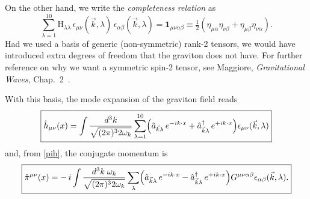 \documentclass[12pt,a4paper,oneside]{article}
\numberwithin{equation}{section}   %
\begin{document}
On the other hand, we write the
\textit{completeness relation} as
\begin{equation}
  \sum_{\lambda=1}^{10}\mathrm{H}_{\lambda\lambda}\,
  \epsilon_{\mu\nu}(\vec{k},\lambda)\,\epsilon_{\alpha\beta}(\vec{k},\lambda)
  = \mathbf{1}_{\mu\nu\alpha\beta}
  \equiv\tfrac12\left(\eta_{\mu\alpha}\eta_{\nu\beta}+\eta_{\mu\beta}\eta_{\nu\alpha}\right).
\label{eq:completeness-dewitt}
\end{equation}
Had we used a basis of generic (non-symmetric) rank-2 tensors, we would have
introduced extra degrees of freedom that the graviton does not have. For
further reference on why we want a symmetric spin-2 tensor, see Maggiore,
\textit{Gravitational Waves}, Chap.~2~\cite{Maggiore2008}.

With this basis, the mode expansion of the graviton field reads
\begin{equation}
\boxed{
  \hat{h}_{\mu\nu}(x)
  = \int \frac{d^3k}{\sqrt{(2\pi)^3 2\omega_k}}
    \sum_{\lambda=1}^{10}
    \Bigl(
      \hat{a}_{\vec{k}\lambda}\, e^{-ik\cdot x}
      + \hat{a}^{\dagger}_{\vec{k}\lambda}\, e^{+ik\cdot x}
    \Bigr)\epsilon_{\mu\nu}(\vec{k},\lambda)
}
\label{eq:modes}
\end{equation}
and, from \eqref{pih}, the conjugate momentum is
\begin{equation}
\boxed{
  \hat{\pi}^{\mu\nu}(x)
  = -\,i\int \frac{d^3k\;\omega_k}{\sqrt{(2\pi)^3 2\omega_k}}
    \sum_{\lambda}
    \Bigl(
      \hat{a}_{\vec{k}\lambda}\, e^{-ik\cdot x}
      - \hat{a}^{\dagger}_{\vec{k}\lambda}\, e^{+ik\cdot x}
    \Bigr)G^{\mu\nu\alpha\beta}\epsilon_{\alpha\beta}(\vec{k},\lambda) .
}
\label{eq:momenta}
\end{equation}
\end{document}
